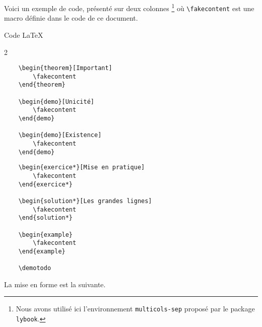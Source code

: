 Voici un exemple de code, présenté sur deux colonnes
\footnote{
	Nous avons utilisé ici l'environnement \texttt{multicols-sep} proposé par le package \texttt{lybook}.
}
où \verb+\fakecontent+ est une macro définie dans le code de ce document.

\begin{frame-gene}{Code \LaTeX}
	\small
	\begin{multicols-sep}{2}
		\begin{verbatim}
	\begin{theorem}[Important]
    	\fakecontent
	\end{theorem}

	\begin{demo}[Unicité]
    	\fakecontent
	\end{demo}

	\begin{demo}[Existence]
    	\fakecontent
	\end{demo}
		\end{verbatim}


		\columnbreak


		\begin{verbatim}
	\begin{exercice*}[Mise en pratique]
    	\fakecontent
	\end{exercice*}

	\begin{solution*}[Les grandes lignes]
    	\fakecontent
	\end{solution*}

	\begin{example}
	    \fakecontent
	\end{example}

	\demotodo
		\end{verbatim}
	\end{multicols-sep}
\end{frame-gene}




La mise en forme est la suivante.

